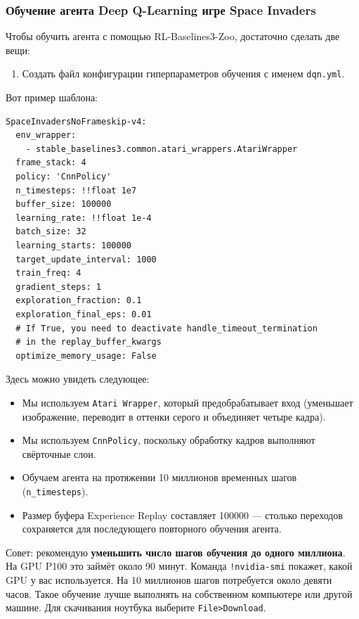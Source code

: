 \documentclass[11pt,a4paper]{article}
\begin{document}
\subsubsection{Обучение агента Deep Q-Learning игре Space Invaders}\label{train-our-deep-q-learning-agent-to-play-space-invaders-space-invaders}

Чтобы обучить агента с помощью RL-Baselines3-Zoo, достаточно сделать две вещи:

\begin{enumerate}
\def\labelenumi{\arabic{enumi}.}
\tightlist
\item
Создать файл конфигурации гиперпараметров обучения с именем \texttt{dqn.yml}.
\end{enumerate}

Вот пример шаблона:

\begin{lstlisting}
SpaceInvadersNoFrameskip-v4:
  env_wrapper:
    - stable_baselines3.common.atari_wrappers.AtariWrapper
  frame_stack: 4
  policy: 'CnnPolicy'
  n_timesteps: !!float 1e7
  buffer_size: 100000
  learning_rate: !!float 1e-4
  batch_size: 32
  learning_starts: 100000
  target_update_interval: 1000
  train_freq: 4
  gradient_steps: 1
  exploration_fraction: 0.1
  exploration_final_eps: 0.01
  # If True, you need to deactivate handle_timeout_termination
  # in the replay_buffer_kwargs
  optimize_memory_usage: False
\end{lstlisting}

Здесь можно увидеть следующее:

\begin{itemize}
\tightlist
\item
Мы используем \texttt{Atari\ Wrapper}, который предобрабатывает вход (уменьшает изображение, переводит в оттенки серого и объединяет четыре кадра).
\item
Мы используем \texttt{CnnPolicy}, поскольку обработку кадров выполняют свёрточные слои.
\item
Обучаем агента на протяжении 10 миллионов временных шагов (\texttt{n\_timesteps}).
\item
Размер буфера Experience Replay составляет 100000 --- столько переходов сохраняется для последующего повторного обучения агента.
\end{itemize}

Совет: рекомендую \textbf{уменьшить число шагов обучения до одного миллиона}. На GPU P100 это займёт около 90 минут. Команда \texttt{!nvidia-smi} покажет, какой GPU у вас используется. На 10 миллионов шагов потребуется около девяти часов. Такое обучение лучше выполнять на собственном компьютере или другой машине. Для скачивания ноутбука выберите \texttt{File\textgreater{}Download}.
\end{document}
